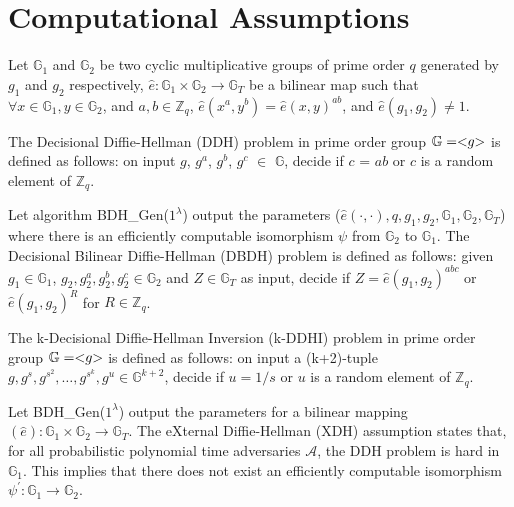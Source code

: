 \section{Computational Assumptions}
\label{app:definition}
Let $\mathbb{G}_{1}$ and $\mathbb{G}_{2}$ be two cyclic multiplicative groups of prime order $q$ generated by $g_1$ and $g_2$ respectively, $\hat{e}: \mathbb{G}_{1} \times \mathbb{G}_{2} \rightarrow \mathbb{G}_{T}$ be a bilinear map such that $\forall x \in \mathbb{G}_{1}, y \in \mathbb{G}_{2}$, and $a,b \in \mathbb{Z}_q$, $\hat{e}(x^{a},y^{b}) = \hat{e}(x,y)^{ab}$, and $\hat{e}(g_{1},g_{2}) \neq 1$. 

\begin{definition}%
\label{def:ddh}
The Decisional Diffie-Hellman (DDH) problem in prime order group $\mathbb{G}=<\hspace{-0.1cm}g\hspace{-0.1cm}>$ is defined as follows: on input $g$, $g^{a}$, $g^{b}$, $g^{c}$ $\in$ $\mathbb{G}$, decide if $c$ = $ab$ or $c$ is a random element of $\mathbb{Z}_{q}$.
\end{definition}

\begin{definition}%
\label{def:dbdh}
Let algorithm BDH\_Gen($1^{\lambda}$) output the parameters ($\hat{e}(\cdot,\cdot), q,g_{1},g_{2},\mathbb{G}_{1},\mathbb{G}_{2},\mathbb{G}_{T}$) where there is an efficiently computable isomorphism $\psi$ from $\mathbb{G}_{2}$ to $\mathbb{G}_{1}$. The Decisional Bilinear Diffie-Hellman (DBDH) problem is defined as follows: given $g_{1} \in \mathbb{G}_{1}$, $ g_{2},g^{a}_{2},g^{b}_{2},g^{c}_{2} \in \mathbb{G}_{2}$ and $Z \in \mathbb{G}_{T}$ as input, decide if $Z = \hat{e}(g_{1},g_{2})^{abc}$ or $\hat{e}(g_{1},g_{2})^{R}$ for $R \in \mathbb{Z}_{q}$.
\end{definition}

\begin{definition}%
\label{def:kddh}
The k-Decisional Diffie-Hellman Inversion (k-DDHI) problem in prime order group $\mathbb{G} = <\hspace{-0.1cm}g\hspace{-0.1cm}>$ is defined as follows: on input a (k+2)-tuple $ g,g^{s},g^{s^{2}}, \ldots,g^{s^{k}}, g^{u} \in \mathbb{G}^{k+2}$, decide if $u = 1/s$ or $u$ is a random element of $\mathbb{Z}_{q}$.
\end{definition}

\begin{definition}%
\label{def:xdh}
Let BDH\_Gen($1^{\lambda}$) output the parameters for a bilinear mapping $(\hat e) : \mathbb{G}_{1} \times \mathbb{G}_{2} \rightarrow \mathbb{G}_{T}$. The eXternal Diffie-Hellman (XDH) assumption states that, for all probabilistic polynomial time adversaries $\mathcal{A}$, the DDH problem is hard in $\mathbb{G}_{1}$. This implies that there does not exist an efficiently computable isomorphism $\psi^{\prime} : \mathbb{G}_{1} \rightarrow \mathbb{G}_{2}$.
\end{definition}
